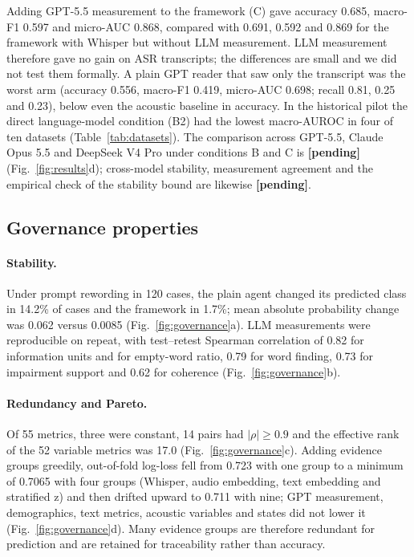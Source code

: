 \documentclass[pdflatex,sn-nature]{sn-jnl}
\begin{document}
Adding GPT-5.5 measurement to the framework (C) gave accuracy 0.685, macro-F1 0.597 and micro-AUC 0.868, compared with 0.691, 0.592 and 0.869 for the framework with Whisper but without LLM measurement. LLM measurement therefore gave no gain on ASR transcripts; the differences are small and we did not test them formally. A plain GPT reader that saw only the transcript was the worst arm (accuracy 0.556, macro-F1 0.419, micro-AUC 0.698; recall 0.81, 0.25 and 0.23), below even the acoustic baseline in accuracy. In the historical pilot the direct language-model condition (B2) had the lowest macro-AUROC in four of ten datasets (Table~\ref{tab:datasets}). The comparison across GPT-5.5, Claude Opus 5.5 and DeepSeek V4 Pro under conditions B and C is \textbf{[pending]} (Fig.~\ref{fig:results}d); cross-model stability, measurement agreement and the empirical check of the stability bound are likewise \textbf{[pending]}.

\subsection{Governance properties}\label{sec:r-gov}

\paragraph{Stability.} Under prompt rewording in 120 cases, the plain agent changed its predicted class in 14.2\% of cases and the framework in 1.7\%; mean absolute probability change was 0.062 versus 0.0085 (Fig.~\ref{fig:governance}a). LLM measurements were reproducible on repeat, with test--retest Spearman correlation of 0.82 for information units and for empty-word ratio, 0.79 for word finding, 0.73 for impairment support and 0.62 for coherence (Fig.~\ref{fig:governance}b).

\paragraph{Redundancy and Pareto.} Of 55 metrics, three were constant, 14 pairs had $|\rho|\geq0.9$ and the effective rank of the 52 variable metrics was 17.0 (Fig.~\ref{fig:governance}c). Adding evidence groups greedily, out-of-fold log-loss fell from 0.723 with one group to a minimum of 0.7065 with four groups (Whisper, audio embedding, text embedding and stratified z) and then drifted upward to 0.711 with nine; GPT measurement, demographics, text metrics, acoustic variables and states did not lower it (Fig.~\ref{fig:governance}d). Many evidence groups are therefore redundant for prediction and are retained for traceability rather than accuracy.
\end{document}
